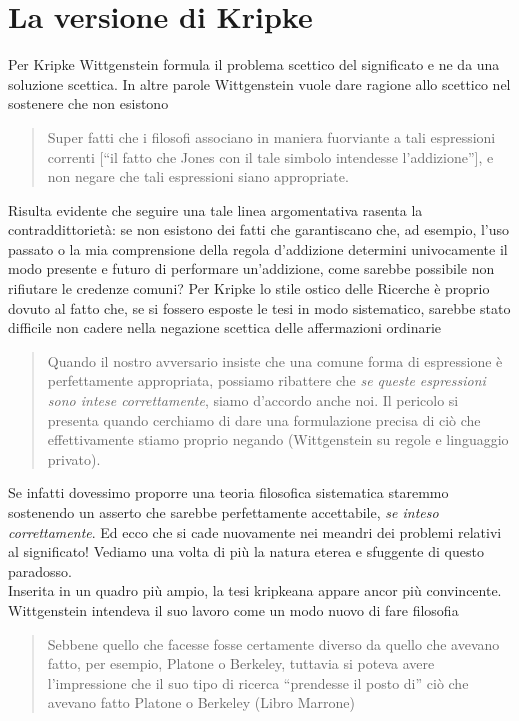 \documentclass[10pt,a4paper]{article}
\begin{document}
\section{La versione di Kripke}
Per Kripke Wittgenstein formula il problema scettico del significato e ne da una soluzione scettica. In altre parole Wittgenstein vuole dare ragione allo scettico nel sostenere che non esistono 
\begin{quote}
	Super fatti  che i filosofi associano in maniera fuorviante a tali espressioni correnti [“il fatto che Jones con il tale simbolo intendesse l’addizione”], e non negare che tali espressioni siano appropriate.
\end{quote}
Risulta evidente che seguire una tale linea argomentativa rasenta la contraddittorietà: se non esistono dei fatti che garantiscano che, ad esempio, l’uso passato o la mia comprensione della regola d’addizione determini univocamente il modo presente e futuro di performare un’addizione, come sarebbe possibile non rifiutare le credenze comuni? Per Kripke lo stile ostico delle Ricerche è proprio dovuto al fatto che, se si fossero esposte le tesi in modo sistematico, sarebbe stato difficile non cadere nella negazione scettica delle affermazioni ordinarie
\begin{quote}
	Quando il nostro avversario insiste che una comune forma di espressione è perfettamente appropriata, possiamo ribattere che \textit{se queste espressioni sono intese correttamente}, siamo d’accordo anche noi. Il pericolo si presenta quando cerchiamo di dare una formulazione precisa di ciò che effettivamente stiamo proprio negando (Wittgenstein su regole e linguaggio privato).
\end{quote} 
Se infatti dovessimo proporre una teoria filosofica sistematica staremmo sostenendo un asserto che sarebbe perfettamente accettabile, \textit{se inteso correttamente}. Ed ecco che si cade nuovamente nei meandri dei problemi relativi al significato! Vediamo una volta di più la natura eterea e sfuggente di questo paradosso.\\
Inserita in un quadro più ampio, la tesi kripkeana appare ancor più convincente. Wittgenstein intendeva il suo lavoro come un modo nuovo di fare filosofia
\begin{quote}
	Sebbene quello che facesse fosse certamente diverso da quello che avevano fatto, per esempio, Platone o Berkeley, tuttavia si poteva avere l’impressione che il suo tipo di ricerca “prendesse il posto di” ciò che avevano fatto Platone o Berkeley (Libro Marrone)
\end{quote}
\end{document}
